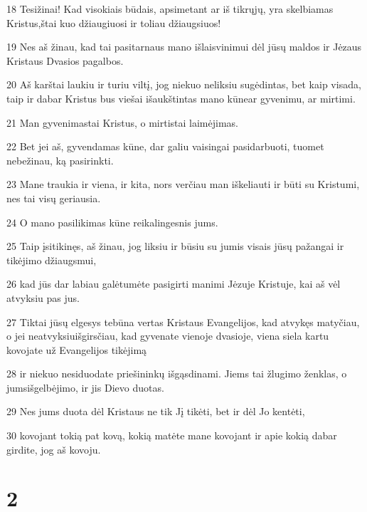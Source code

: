\par 18 Tesižinai! Kad visokiais būdais, apsimetant ar iš tikrųjų, yra skelbiamas Kristus,­štai kuo džiaugiuosi ir toliau džiaugsiuos! 
\par 19 Nes aš žinau, kad tai pasitarnaus mano išlaisvinimui dėl jūsų maldos ir Jėzaus Kristaus Dvasios pagalbos. 
\par 20 Aš karštai laukiu ir turiu viltį, jog niekuo neliksiu sugėdintas, bet kaip visada, taip ir dabar Kristus bus viešai išaukštintas mano kūne­ar gyvenimu, ar mirtimi. 
\par 21 Man gyvenimas­tai Kristus, o mirtis­tai laimėjimas. 
\par 22 Bet jei aš, gyvendamas kūne, dar galiu vaisingai pasidarbuoti, tuomet nebežinau, ką pasirinkti. 
\par 23 Mane traukia ir viena, ir kita, nors verčiau man iškeliauti ir būti su Kristumi, nes tai visų geriausia. 
\par 24 O mano pasilikimas kūne reikalingesnis jums. 
\par 25 Taip įsitikinęs, aš žinau, jog liksiu ir būsiu su jumis visais jūsų pažangai ir tikėjimo džiaugsmui, 
\par 26 kad jūs dar labiau galėtumėte pasigirti manimi Jėzuje Kristuje, kai aš vėl atvyksiu pas jus. 
\par 27 Tiktai jūsų elgesys tebūna vertas Kristaus Evangelijos, kad atvykęs matyčiau, o jei neatvyksiu­išgirsčiau, kad gyvenate vienoje dvasioje, viena siela kartu kovojate už Evangelijos tikėjimą 
\par 28 ir niekuo nesiduodate priešininkų išgąsdinami. Jiems tai žlugimo ženklas, o jums­išgelbėjimo, ir jis Dievo duotas. 
\par 29 Nes jums duota dėl Kristaus ne tik Jį tikėti, bet ir dėl Jo kentėti, 
\par 30 kovojant tokią pat kovą, kokią matėte mane kovojant ir apie kokią dabar girdite, jog aš kovoju.


\chapter{2}


